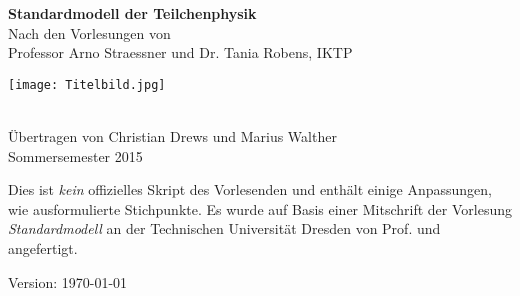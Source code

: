 \documentclass[a4paper,11pt,fleqn,parskip=full,captions=tableheading,draft]{scrbook}
\date{\today}
\newcommand{\lectitel}{Standardmodell der Teilchenphysik}
\newcommand{\authors}{Christian Drews und Marius Walther}
\begin{document}
\begin{titlepage}
	
\begin{center}
	{\fontsize{32}{40} \selectfont \textcolor{dpurple}{\textbf{\lectitel}}}\\[1.2cm]
	{\large Nach den Vorlesungen von}\\[0.3cm]
	{\LARGE Professor Arno Straessner und Dr. Tania Robens, IKTP}\\[2cm]
	\makebox[\linewidth]{\textcolor{lpurple}{\rule{\paperwidth}{1.3cm}}}
\end{center}
\vspace{-.7cm}
\hspace{-4.5cm}\texttt{[image: Titelbild.jpg]}
\vspace{-1cm}
\begin{center}
	\makebox[\linewidth]{\textcolor{lpurple}{\rule{\paperwidth}{1.3cm}}}\\[1cm]
	{\large Übertragen von \authors}\\[0.5cm]
	{\large Sommersemester 2015}
\end{center}
\end{titlepage}
\newpage
\thispagestyle{empty}
\null\vspace {.66\textheight}
Dies ist \emph{kein} offizielles Skript des Vorlesenden und enthält einige
Anpassungen, wie ausformulierte Stichpunkte. Es wurde auf Basis
einer Mitschrift der Vorlesung \textit{Standardmodell} an der
Technischen Universität Dresden von Prof.  und  angefertigt.

Version: \today
\restoregeometry

\tableofcontents

%
%
%
%
%
\end{document}
